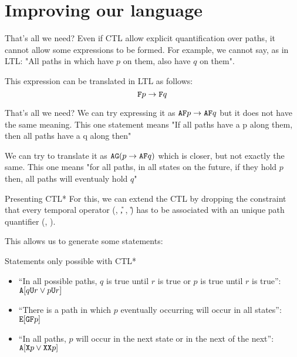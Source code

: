 \section{Improving our language}
\begin{frame}{That's all we need?}
    Even if CTL allow explicit quantification over paths, it cannot allow some expressions to be formed. For example, we cannot say, as in LTL: "All paths in which have $p$ on them, also have $q$ on them".

    This expression can be translated in LTL as follows: 
    $$\texttt{F} p \to \texttt{F} q$$
\end{frame}

\begin{frame}{That's all we need?}
    We can try expressing it as $\texttt{A}\texttt{F} p \to \texttt{A}\texttt{F} q$ but it does not have the same meaning. This one statement means "If all paths have a p along them, then all paths have a q along then"\pause
    
    We can try to translate it as $\texttt{A}\texttt{G}(p\to\texttt{A}\texttt{F} q)$ which is closer, but not exactly the same. This one means "for all paths, in all states on the future, if they hold $p$ then, all paths will eventualy hold $q$"
\end{frame}

\begin{frame}{Presenting CTL*}
    For this, we can extend the CTL by dropping the constraint that every temporal operator (\X, \U, \F, \G) has to be associated with an unique path quantifier (\A, \E). \pause
    
    This allows us to generate some statements:
\end{frame}

\begin{frame}{Statements only possible with CTL*}
        \begin{itemize}
            \item
            {
                ``In all possible paths, $q$ is true until $r$ is true or $p$ is true until $r$ is true'': $\texttt{A}[q \texttt{U} r \lor p \texttt{U} r]$
                \pause
            }
            \item
            {
                ``There is a path in which $p$ eventually occurring will occur in all states'': $\texttt{E}[\texttt{G}\texttt{F} p]$
                \pause
            }
            \item
            {
                ``In all paths, $p$ will occur in the next state or in the next of the next'': $\texttt{A}[\texttt{X} p \lor \texttt{X}\texttt{X} p]$
                \pause                
            }
        \end{itemize}
\end{frame}

